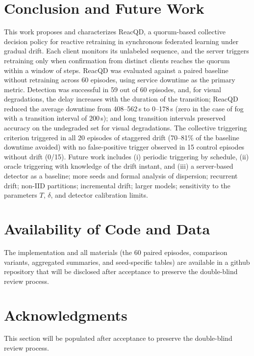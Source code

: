 \documentclass[conference]{IEEEtran}
\begin{document}
\section{Conclusion and Future Work}
This work proposes and characterizes ReacQD, a quorum-based collective decision policy for reactive retraining in synchronous federated learning under gradual drift. Each client monitors its unlabeled sequence, and the server triggers retraining only when confirmation from distinct clients reaches the quorum within a window of steps. ReacQD was evaluated against a paired baseline without retraining across 60 episodes, using service downtime as the primary metric. Detection was successful in 59 out of 60 episodes, and, for visual degradations, the delay increases with the duration of the transition; ReacQD reduced the average downtime from 408--562\,s to 0--178\,s (zero in the case of fog with a transition interval of 200\,s); and long transition intervals preserved accuracy on the undegraded set for visual degradations. The collective triggering criterion triggered in all 20 episodes of staggered drift (70--81\% of the baseline downtime avoided) with no false-positive trigger observed in 15 control episodes without drift (0/15). Future work includes (i) periodic triggering by schedule, (ii) oracle triggering with knowledge of the drift instant, and (iii) a server-based detector as a baseline; more seeds and formal analysis of dispersion; recurrent drift; non-IID partitions; incremental drift; larger models; sensitivity to the parameters $T$, $\delta$, and detector calibration limits.

\section*{Availability of Code and Data}
The implementation and all materials (the 60 paired episodes, comparison variants, aggregated summaries, and seed-specific tables) are available in a github repository that will be disclosed after acceptance to preserve the double-blind review process.%

\section*{Acknowledgments}
This section will be populated after acceptance to preserve the double-blind review process.
\end{document}
